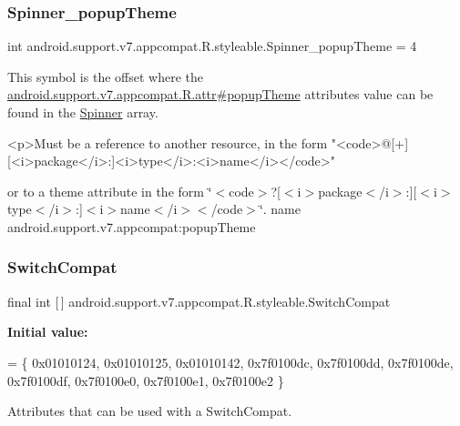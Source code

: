 \subsubsection{\texorpdfstring{Spinner\+\_\+popup\+Theme}{Spinner\_popupTheme}}
{\footnotesize\ttfamily int android.\+support.\+v7.\+appcompat.\+R.\+styleable.\+Spinner\+\_\+popup\+Theme = 4\hspace{0.3cm}{\ttfamily [static]}}

This symbol is the offset where the \hyperlink{classandroid_1_1support_1_1v7_1_1appcompat_1_1R_1_1attr_a7163bdfa188237fc5f6cb7ec583125e4}{android.\+support.\+v7.\+appcompat.\+R.\+attr\#popup\+Theme} attribute\textquotesingle{}s value can be found in the \hyperlink{classandroid_1_1support_1_1v7_1_1appcompat_1_1R_1_1styleable_a63a8e6de3d44afcd176eaa79214fd8a5}{Spinner} array.

\begin{DoxyVerb}      <p>Must be a reference to another resource, in the form "<code>@[+][<i>package</i>:]<i>type</i>:<i>name</i></code>"
\end{DoxyVerb}
 or to a theme attribute in the form \char`\"{}$<$code$>$?\mbox{[}$<$i$>$package$<$/i$>$\+:\mbox{]}\mbox{[}$<$i$>$type$<$/i$>$\+:\mbox{]}$<$i$>$name$<$/i$>$$<$/code$>$\char`\"{}.  name android.\+support.\+v7.\+appcompat\+:popup\+Theme \mbox{\label{classandroid_1_1support_1_1v7_1_1appcompat_1_1R_1_1styleable_aabe688560752254f2288f3eaf9439737}} 
\subsubsection{\texorpdfstring{Switch\+Compat}{SwitchCompat}}
{\footnotesize\ttfamily final int \mbox{[}$\,$\mbox{]} android.\+support.\+v7.\+appcompat.\+R.\+styleable.\+Switch\+Compat\hspace{0.3cm}{\ttfamily [static]}}

{\bfseries Initial value\+:}
\begin{DoxyCode}
= \{
            0x01010124, 0x01010125, 0x01010142, 0x7f0100dc,
            0x7f0100dd, 0x7f0100de, 0x7f0100df, 0x7f0100e0,
            0x7f0100e1, 0x7f0100e2
        \}
\end{DoxyCode}
Attributes that can be used with a Switch\+Compat. 

